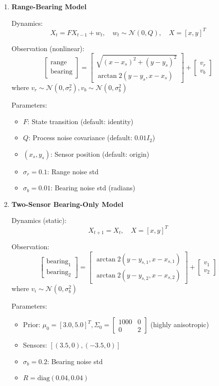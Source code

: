 \documentclass{article}
\begin{document}
\begin{enumerate}
\item \textbf{Range-Bearing Model}

Dynamics:
\[ X_t = F X_{t-1} + w_t, \quad w_t \sim \mathcal{N}(0, Q), \quad X = [x, y]^T \]

Observation (nonlinear):
\[ \begin{bmatrix} \text{range} \\ \text{bearing} \end{bmatrix} = \begin{bmatrix} \sqrt{(x - x_s)^2 + (y - y_s)^2} \\ \arctan2(y - y_s, x - x_s) \end{bmatrix} + \begin{bmatrix} v_r \\ v_b \end{bmatrix} \]
where $v_r \sim \mathcal{N}(0, \sigma_r^2), v_b \sim \mathcal{N}(0, \sigma_b^2)$

Parameters:
\begin{itemize}
\item $F$: State transition (default: identity)
\item $Q$: Process noise covariance (default: $0.01 I_2$)
\item $(x_s, y_s)$: Sensor position (default: origin)
\item $\sigma_r = 0.1$: Range noise std
\item $\sigma_b = 0.01$: Bearing noise std (radians)
\end{itemize}

\item \textbf{Two-Sensor Bearing-Only Model}

Dynamics (static):
\[ X_{t+1} = X_t, \quad X = [x, y]^T \]

Observation:
\[ \begin{bmatrix} \text{bearing}_1 \\ \text{bearing}_2 \end{bmatrix} = \begin{bmatrix} \arctan2(y - y_{s,1}, x - x_{s,1}) \\ \arctan2(y - y_{s,2}, x - x_{s,2}) \end{bmatrix} + \begin{bmatrix} v_1 \\ v_2 \end{bmatrix} \]
where $v_i \sim \mathcal{N}(0, \sigma_b^2)$

Parameters:
\begin{itemize}
\item Prior: $\mu_0 = [3.0, 5.0]^T, \Sigma_0 = \begin{bmatrix} 1000 & 0 \\ 0 & 2 \end{bmatrix}$ (highly anisotropic)
\item Sensors: $[(3.5, 0), (-3.5, 0)]$
\item $\sigma_b = 0.2$: Bearing noise std
\item $R = \text{diag}(0.04, 0.04)$
\end{itemize}


\end{enumerate}
\end{document}
